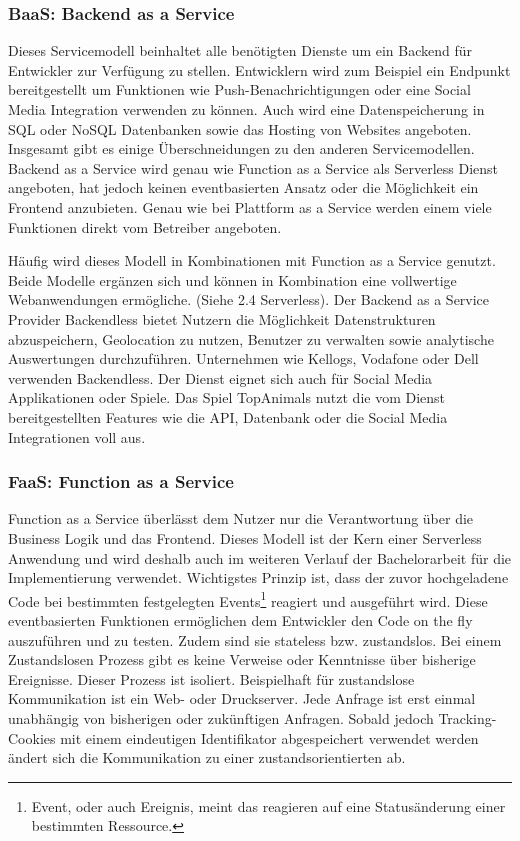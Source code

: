    \subsubsection{BaaS: Backend as a Service}
   Dieses Servicemodell beinhaltet alle benötigten Dienste um ein Backend für Entwickler zur Verfügung zu stellen.
   Entwicklern wird zum Beispiel ein Endpunkt bereitgestellt um Funktionen wie Push-Benachrichtigungen oder eine Social Media Integration verwenden zu können.
   Auch wird eine Datenspeicherung in SQL oder NoSQL Datenbanken sowie das Hosting von Websites angeboten. Insgesamt gibt es einige Überschneidungen zu den anderen Servicemodellen.
   Backend as a Service wird genau wie Function as a Service als Serverless Dienst angeboten, hat jedoch keinen eventbasierten Ansatz oder die Möglichkeit ein Frontend anzubieten.
   Genau wie bei Plattform as a Service werden einem viele Funktionen direkt vom Betreiber angeboten.

   Häufig wird dieses Modell in Kombinationen mit Function as a Service genutzt. Beide Modelle ergänzen sich und können in Kombination eine vollwertige
   Webanwendungen ermögliche. (Siehe 2.4 Serverless).
   Der Backend as a Service Provider Backendless bietet Nutzern die Möglichkeit Datenstrukturen abzuspeichern, Geolocation zu nutzen,
   Benutzer zu verwalten sowie analytische Auswertungen durchzuführen. Unternehmen wie Kellogs, Vodafone oder Dell verwenden Backendless.
   Der Dienst eignet sich auch für Social Media Applikationen oder Spiele. Das Spiel TopAnimals nutzt die vom Dienst bereitgestellten Features wie
   die API, Datenbank oder die Social Media Integrationen voll aus. \cite[]{Backendless}


   \subsubsection{FaaS: Function as a Service}
   \label{FaaS}
   Function as a Service überlässt dem Nutzer nur die Verantwortung über die Business Logik und das Frontend.
   Dieses Modell ist der Kern einer Serverless Anwendung und wird deshalb auch im weiteren Verlauf der Bachelorarbeit für die Implementierung
   verwendet.
   Wichtigstes Prinzip ist, dass der zuvor hochgeladene Code bei bestimmten festgelegten Events\footnote{Event, oder auch Ereignis, meint das reagieren auf eine Statusänderung einer bestimmten Ressource.} reagiert und ausgeführt wird.
   Diese eventbasierten Funktionen ermöglichen dem Entwickler den Code on the fly auszuführen und zu testen.
   Zudem sind sie stateless bzw. zustandslos. Bei einem Zustandslosen Prozess gibt es keine Verweise oder Kenntnisse über bisherige Ereignisse.
   Dieser Prozess ist isoliert. Beispielhaft für zustandslose Kommunikation ist ein Web- oder Druckserver.
   Jede Anfrage ist erst einmal unabhängig von bisherigen oder zukünftigen Anfragen.
   Sobald jedoch Tracking-Cookies mit einem eindeutigen Identifikator abgespeichert verwendet werden ändert sich die Kommunikation zu einer zustandsorientierten ab.\cite[]{Zustandslos}

